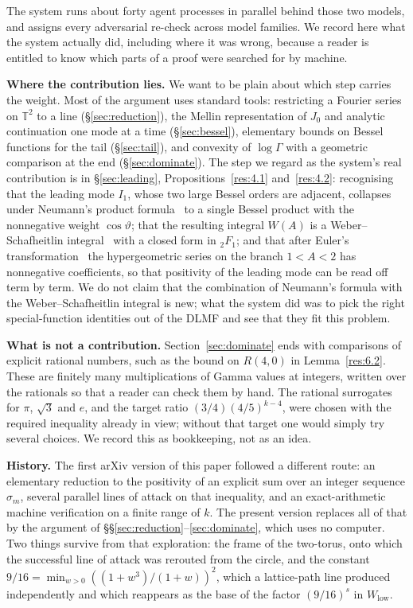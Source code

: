 \documentclass[11pt]{article}
\theoremstyle{plain}
\theoremstyle{definition}
\theoremstyle{remark}
\begin{document}
The system runs about forty agent processes in parallel behind those two models, and assigns every adversarial re-check across model families. We record here what the system actually did, including where it was wrong, because a reader is entitled to know which parts of a proof were searched for by machine.

\textbf{Where the contribution lies.} We want to be plain about which step carries the weight. Most of the argument uses standard tools: restricting a Fourier series on $\mathbb{T}^{2}$ to a line (\S\ref{sec:reduction}), the Mellin representation of $J_{0}$ and analytic continuation one mode at a time (\S\ref{sec:bessel}), elementary bounds on Bessel functions for the tail (\S\ref{sec:tail}), and convexity of $\log \Gamma$ with a geometric comparison at the end (\S\ref{sec:dominate}). The step we regard as the system's real contribution is in \S\ref{sec:leading}, Propositions~\ref{res:4.1} and~\ref{res:4.2}: recognising that the leading mode $I_{1}$, whose two large Bessel orders are adjacent, collapses under Neumann's product formula~\cite[Eq.~10.9.26]{r1} to a single Bessel product with the nonnegative weight $\cos \vartheta$; that the resulting integral $W(A)$ is a Weber--Schafheitlin integral~\cite[Eq.~10.22.56]{r1} with a closed form in ${}_{2}F_{1}$; and that after Euler's transformation~\cite[Eq.~15.8.1]{r1} the hypergeometric series on the branch $1 < A < 2$ has nonnegative coefficients, so that positivity of the leading mode can be read off term by term. We do not claim that the combination of Neumann's formula with the Weber--Schafheitlin integral is new; what the system did was to pick the right special-function identities out of the DLMF and see that they fit this problem.

\textbf{What is not a contribution.} Section~\ref{sec:dominate} ends with comparisons of explicit rational numbers, such as the bound on $R(4,0)$ in Lemma~\ref{res:6.2}. These are finitely many multiplications of Gamma values at integers, written over the rationals so that a reader can check them by hand. The rational surrogates for $\pi$, $\sqrt{3}$ and $e$, and the target ratio $(3/4)(4/5)^{k-4}$, were chosen with the required inequality already in view; without that target one would simply try several choices. We record this as bookkeeping, not as an idea.

\textbf{History.} The first arXiv version of this paper followed a different route: an elementary reduction to the positivity of an explicit sum over an integer sequence $\sigma_m$, several parallel lines of attack on that inequality, and an exact-arithmetic machine verification on a finite range of $k$. The present version replaces all of that by the argument of \S\S\ref{sec:reduction}--\ref{sec:dominate}, which uses no computer. Two things survive from that exploration: the frame of the two-torus, onto which the successful line of attack was rerouted from the circle, and the constant $9/16 = \min_{w>0} ((1+w^{3})/(1+w))^{2}$, which a lattice-path line produced independently and which reappears as the base of the factor $(9/16)^{s}$ in $W_{\mathrm{low}}$.
\end{document}

